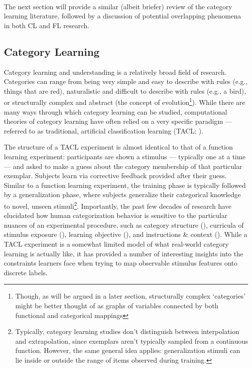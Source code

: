 \documentclass[12pt]{article}
\let\oldcite=\cite
\renewcommand{\cite}[1]{\textcolor[rgb]{0, .121, .388}{\oldcite{#1}}}
\begin{document}

\mbox{}\\
The next section will provide a similar (albeit briefer) review of the category learning literature, followed by a discussion of potential overlapping phenomena in both CL and FL research.

\subsection{Category Learning}

Category learning and understanding is a relatively broad field of research. Categories can range from being very simple and easy to describe with rules (e.g., things that are red), naturalistic and difficult to describe with rules (e.g., a bird), or structurally complex and abstract (the concept of evolution\footnote{Though, as will be argued in a later section, structurally complex `categories' might be better thought of as graphs of variables connected by both functional and categorical mappings}). While there are many ways through which category learning can be studied, computational theories of category learning have often relied on a very specific paradigm --- referred to as traditional, artificial classification learning (TACL; \cite{kurtz2015human}). 

The structure of a TACL experiment is almost identical to that of a function learning experiment: participants are shown a stimulus --- typically one at a time --- and asked to make a guess about the category membership of that particular exemplar. Subjects learn via corrective feedback provided after their guess. Similar to a function learning experiment, the training phase is typically followed by a generalization phase, where subjects generalize their categorical knowledge to novel, unseen stimuli\footnote{Typically, category learning studies don't distinguish between interpolation and extrapolation, since exemplars aren't typically sampled from a continuous function. However, the same general idea applies: generalization stimuli can lie inside or outside the range of items observed during training.}. Importantly, the past few decades of research have elucidated how human categorization behavior is sensitive to the particular nuances of an experimental procedure, such as category structure (\cite{shepard1961learning,kruschke1993human,nosofsky1992investigations,ashby1988decision}), curricula of stimulus exposure (\cite{kurtz1953effect,kornell2008learning}), learning objective (\cite{chin2004diagnosticity,kattner2016transfer}), and instructions \& context (\cite{kurtz2013human}). While a TACL experiment is a somewhat limited model of what real-world category learning is actually like, it has provided a number of interesting insights into the constraints learners face when trying to map observable stimulus features onto discrete labels.
\end{document}
